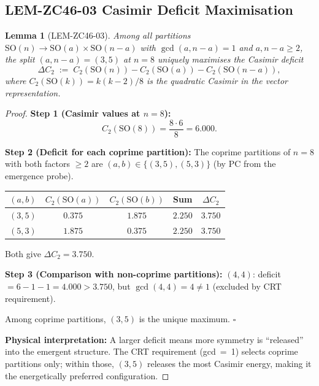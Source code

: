 \documentclass[12pt, a4paper]{article}
\newtheorem{lemma}{Lemma}[section]
\begin{document}
\subsection{LEM-ZC46-03 \quad Casimir Deficit Maximisation}


\begin{formalbox}[title={LEM-ZC46-03: SO(3)$\times$SO(5) Is the
  Unique Maximum-Casimir-Deficit Coprime Partition of SO(8)
  (Near-Formal)}]

\begin{lemma}[LEM-ZC46-03]
\label{lem:zc46-03}
Among all partitions $\mathrm{SO}(n) \to
\mathrm{SO}(a) \times \mathrm{SO}(n-a)$ with $\gcd(a, n-a) = 1$
and $a, n-a \geq 2$, the split $(a, n-a) = (3, 5)$ at $n = 8$
uniquely maximises the Casimir deficit
\[
  \Delta C_2 \;:=\;
  C_2(\mathrm{SO}(n)) - C_2(\mathrm{SO}(a)) - C_2(\mathrm{SO}(n-a)),
\]
where $C_2(\mathrm{SO}(k)) = k(k-2)/8$ is the quadratic Casimir
in the vector representation.
\end{lemma}

\begin{proof}
\textbf{Step 1 (Casimir values at $n=8$):}
\[
  C_2(\mathrm{SO}(8)) = \frac{8\cdot 6}{8} = 6.000.
\]

\textbf{Step 2 (Deficit for each coprime partition):}
The coprime partitions of $n = 8$ with both factors $\geq 2$ are
$(a, b) \in \{(3,5), (5,3)\}$ (by PC from the emergence probe).
\begin{center}
\renewcommand{\arraystretch}{1.3}
\begin{tabular}{ccccc}
\toprule
$(a,b)$ & $C_2(\mathrm{SO}(a))$ & $C_2(\mathrm{SO}(b))$ &
  Sum & $\Delta C_2$\\
\midrule
$(3,5)$ & $0.375$ & $1.875$ & $2.250$ & $\mathbf{3.750}$\\
$(5,3)$ & $1.875$ & $0.375$ & $2.250$ & $3.750$\\
\bottomrule
\end{tabular}
\end{center}
Both give $\Delta C_2 = 3.750$.

\textbf{Step 3 (Comparison with non-coprime partitions):}
$(4,4)$: deficit $= 6 - 1 - 1 = 4.000 > 3.750$, but
$\gcd(4,4) = 4 \neq 1$ (excluded by CRT requirement).

Among coprime partitions, $(3,5)$ is the unique maximum.
\hfill$\square$

\textbf{Physical interpretation:} A larger deficit means more
symmetry is ``released'' into the emergent structure.
The CRT requirement (gcd~=~1) selects coprime partitions only;
within those, $(3,5)$ releases the most Casimir energy,
making it the energetically preferred configuration.
\end{proof}
\end{formalbox}
\end{document}
